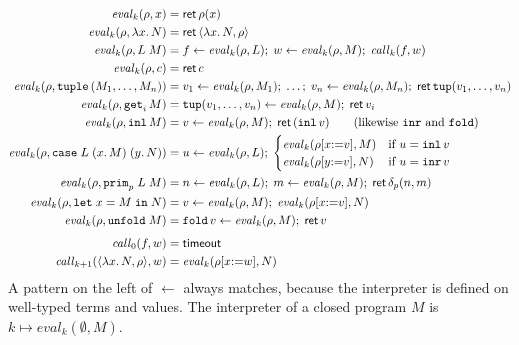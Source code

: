 \begin{align*}
  \mathit{eval}_k(\rho, x) &= \mathsf{ret}\,\rho(x) \\
  \mathit{eval}_k(\rho, \lambda x.\,N) &= \mathsf{ret}\,\langle \lambda x.\,N, \rho\rangle \\
  \mathit{eval}_k(\rho, L\;M) &= f \leftarrow \mathit{eval}_k(\rho, L);\; w \leftarrow \mathit{eval}_k(\rho, M);\; \mathit{call}_k(f, w) \\
  \mathit{eval}_k(\rho, c) &= \mathsf{ret}\,c \\
  \mathit{eval}_k(\rho, \mathtt{tuple}\,(M_1, \ldots, M_n)) &= v_1 \leftarrow \mathit{eval}_k(\rho, M_1);\; \ldots;\; v_n \leftarrow \mathit{eval}_k(\rho, M_n);\;
    \mathsf{ret}\,\mathtt{tup}(v_1, \ldots, v_n) \\
  \mathit{eval}_k(\rho, \mathtt{get}_i\,M) &= \mathtt{tup}(v_1, \ldots, v_n) \leftarrow \mathit{eval}_k(\rho, M);\; \mathsf{ret}\,v_i \\
  \mathit{eval}_k(\rho, \mathtt{inl}\,M) &= v \leftarrow \mathit{eval}_k(\rho, M);\; \mathsf{ret}\,(\mathtt{inl}\,v)
  \qquad\text{(likewise $\mathtt{inr}$ and $\mathtt{fold}$)} \\
  \mathit{eval}_k(\rho, \mathtt{case}\;L\;(x.\,M)\;(y.\,N)) &= u \leftarrow \mathit{eval}_k(\rho, L);\;
    \begin{cases}
      \mathit{eval}_k(\rho[x{:=}v], M) & \text{if } u = \mathtt{inl}\,v\\
      \mathit{eval}_k(\rho[y{:=}v], N) & \text{if } u = \mathtt{inr}\,v
    \end{cases} \\
  \mathit{eval}_k(\rho, \mathtt{prim}_p\;L\;M) &= n \leftarrow \mathit{eval}_k(\rho, L);\; m \leftarrow \mathit{eval}_k(\rho, M);\; \mathsf{ret}\,\delta_p(n, m) \\
  \mathit{eval}_k(\rho, \mathtt{let}\;x = M\;\mathtt{in}\;N) &= v \leftarrow \mathit{eval}_k(\rho, M);\; \mathit{eval}_k(\rho[x{:=}v], N) \\
  \mathit{eval}_k(\rho, \mathtt{unfold}\;M) &= \mathtt{fold}\,v \leftarrow \mathit{eval}_k(\rho, M);\; \mathsf{ret}\,v \\[4pt]
  \mathit{call}_0(f, w) &= \mathsf{timeout} \\
  \mathit{call}_{k+1}(\langle \lambda x.\,N, \rho\rangle, w) &= \mathit{eval}_k(\rho[x{:=}w], N)
\end{align*}
A pattern on the left of $\leftarrow$ always matches, because the
interpreter is defined on well-typed terms and values. The interpreter
of a closed program $M$ is $k \mapsto \mathit{eval}_k(\emptyset, M)$.

